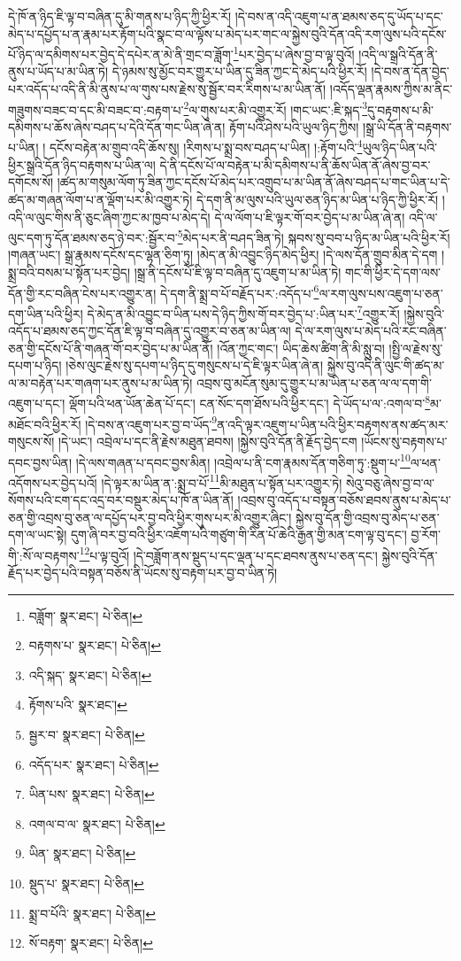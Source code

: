 དེ་ཁོ་ན་ཉིད་ཇི་ལྟ་བ་བཞིན་དུ་མི་གནས་པ་ཉིད་ཀྱི་ཕྱིར་རོ། །དེ་བས་ན་འདི་འཇུག་པ་ན་ཐམས་ཅད་དུ་ཡོད་པ་དང་མེད་པ་དཔྱོད་པ་ན་རྣམ་པར་རྟོག་པའི་སྣང་བ་ལ་ལྟོས་པ་མེད་པར་གང་ལ་སྐྱེས་བུའི་དོན་འདི་རག་ལུས་པའི་དངོས་པོ་ཉིད་ལ་དམིགས་པར་བྱེད་དེ་དཔེར་ན་མེ་ནི་གྲང་བ་ཟློག་\footnote{བཟློག་  སྣར་ཐང་།  པེ་ཅིན། }པར་བྱེད་པ་ཞེས་བྱ་བ་ལྟ་བུའོ། །འདི་ལ་སྒྲའི་དོན་ནི་ནུས་པ་ཡོད་པ་མ་ཡིན་ཏེ། དེ་ཉམས་སུ་མྱོང་བར་གྱུར་པ་ཡིན་དུ་ཟིན་ཀྱང་དེ་མེད་པའི་ཕྱིར་རོ། །དེ་བས་ན་དོན་བྱེད་པར་འདོད་པ་འདི་ནི་མི་ནུས་པ་ལ་གུས་པས་རྗེས་སུ་སྦྱོར་བར་རིགས་པ་མ་ཡིན་ནོ། །འདོད་ལྡན་རྣམས་ཀྱིས་མ་ནིང་གཟུགས་བཟང་བ་དང་མི་བཟང་བ་:བརྟག་པ་\footnote{བརྟགས་པ་  སྣར་ཐང་།  པེ་ཅིན། }ལ་གུས་པར་མི་འགྱུར་རོ། །གང་ཡང་:ཇི་སྐད་\footnote{འདི་སྐད་  སྣར་ཐང་།  པེ་ཅིན། }དུ་བརྟགས་པ་མི་དམིགས་པ་ཆོས་ཞེས་བཤད་པ་དེའི་དོན་གང་ཡིན་ཞེ་ན། རྟོག་པའི་ཤེས་པའི་ཡུལ་ཉིད་ཀྱིས། །སྒྲ་ཡི་དོན་ནི་བརྟགས་པ་ཡིན། །
དངོས་བརྟེན་མ་གྲུབ་འདི་ཆོས་སུ། །རིགས་པ་སྨྲ་བས་བཤད་པ་ཡིན། །:རྟོག་པའི་\footnote{རྟོགས་པའི་  སྣར་ཐང་། }ཡུལ་ཉིད་ཡིན་པའི་ཕྱིར་སྒྲའི་དོན་ཉིད་བརྟགས་པ་ཡིན་ལ། དེ་ནི་དངོས་པོ་ལ་བརྟེན་པ་མི་དམིགས་པ་ནི་ཆོས་ཡིན་ནོ་ཞེས་བྱ་བར་དགོངས་སོ། །ཚད་མ་གསུམ་ལོག་ཏུ་ཟིན་ཀྱང་དངོས་པོ་མེད་པར་འགྲུབ་པ་མ་ཡིན་ནོ་ཞེས་བཤད་པ་གང་ཡིན་པ་དེ་ཚད་མ་གཞན་ལོག་པ་ན་ལྡོག་པར་མི་འགྱུར་ཏེ། དེ་དག་ནི་མ་ལུས་པའི་ཡུལ་ཅན་ཉིད་མ་ཡིན་པ་ཉིད་ཀྱི་ཕྱིར་རོ། །འདི་ལ་ལུང་གིས་ནི་ཅུང་ཞིག་ཀྱང་མ་ཁྱབ་པ་མེད་དེ། དེ་ལ་ལོག་པ་ཇི་ལྟར་གོ་བར་བྱེད་པ་མ་ཡིན་ཞེ་ན། འདི་ལ་ལུང་དག་ཏུ་དོན་ཐམས་ཅད་ཉེ་བར་:སྦྱོར་བ་\footnote{སྦྱར་བ་  སྣར་ཐང་།  པེ་ཅིན། }མེད་པར་ནི་བཤད་ཟིན་ཏེ། སྐབས་སུ་བབ་པ་ཉིད་མ་ཡིན་པའི་ཕྱིར་རོ། །གཞན་ཡང་། སྒྲ་རྣམས་དངོས་དང་ལྷན་ཅིག་ཏུ། །མེད་ན་མི་འབྱུང་ཉིད་མེད་ཕྱིར། །དེ་ལས་དོན་གྲུབ་མིན་དེ་དག །སྨྲ་བའི་བསམ་པ་སྟོན་པར་བྱེད། །སྒྲ་ནི་དངོས་པོ་ཇི་ལྟ་བ་བཞིན་དུ་འཇུག་པ་མ་ཡིན་ཏེ། གང་གི་ཕྱིར་དེ་དག་ལས་དོན་གྱི་རང་བཞིན་ངེས་པར་འགྱུར་ན། དེ་དག་ནི་སྨྲ་བ་པོ་བརྗོད་པར་:འདོད་པ་\footnote{འདོད་པར་  སྣར་ཐང་།  པེ་ཅིན། }ལ་རག་ལུས་པས་འཇུག་པ་ཅན་དག་ཡིན་པའི་ཕྱིར། དེ་མེད་ན་མི་འབྱུང་བ་ཡིན་པས་དེ་ཉིད་ཀྱིས་གོ་བར་བྱེད་པ་:ཡིན་པར་\footnote{ཡིན་པས་  སྣར་ཐང་།  པེ་ཅིན། }འགྱུར་རོ། །སྐྱེས་བུའི་འདོད་པ་ཐམས་ཅད་ཀྱང་དོན་ཇི་ལྟ་བ་བཞིན་དུ་འགྱུར་བ་ཅན་མ་ཡིན་ལ། དེ་ལ་རག་ལུས་པ་མེད་པའི་རང་བཞིན་ཅན་གྱི་དངོས་པོ་ནི་གཞན་གོ་བར་བྱེད་པ་མ་ཡིན་ནོ། །འོན་ཀྱང་གང་། ཡིད་ཆེས་ཚིག་ནི་མི་སླུ་བ། །སྤྱི་ལ་རྗེས་སུ་དཔག་པ་ཉིད། །ཅེས་ལུང་རྗེས་སུ་དཔག་པ་ཉིད་དུ་གསུངས་པ་དེ་ཇི་ལྟར་ཡིན་ཞེ་ན། སྐྱེས་བུ་འདི་ནི་ལུང་གི་ཚད་མ་ལ་མ་བརྟེན་པར་གཞག་པར་ནུས་པ་མ་ཡིན་ཏེ། འབྲས་བུ་མངོན་སུམ་དུ་གྱུར་པ་མ་ཡིན་པ་ཅན་ལ་ལ་དག་གི་འཇུག་པ་དང་། ལྡོག་པའི་ཕན་ཡོན་ཆེན་པོ་དང་། ངན་སོང་དག་ཐོས་པའི་ཕྱིར་དང་། དེ་ཡོད་པ་ལ་:འགལ་བ་\footnote{འགལ་བ་ལ་  སྣར་ཐང་།  པེ་ཅིན། }མ་མཐོང་བའི་ཕྱིར་རོ། །དེ་བས་ན་འཇུག་པར་བྱ་བ་ཡོད་\footnote{ཡིན་  སྣར་ཐང་།  པེ་ཅིན། }ན་འདི་ལྟར་འཇུག་པ་ཡིན་པའི་ཕྱིར་བརྟགས་ནས་ཚད་མར་གསུངས་སོ། །དེ་ཡང་། འབྲེལ་པ་དང་ནི་རྗེས་མཐུན་ཐབས། །སྐྱེས་བུའི་དོན་ནི་རྗོད་བྱེད་ངག །ཡོངས་སུ་བརྟགས་པ་དབང་བྱས་ཡིན། །དེ་ལས་གཞན་པ་དབང་བྱས་མིན། །འབྲེལ་པ་ནི་ངག་རྣམས་དོན་གཅིག་ཏུ་:སྡུག་པ་\footnote{སྡུད་པ་  སྣར་ཐང་།  པེ་ཅིན། }ལ་ཕན་འདོགས་པར་བྱེད་པའོ། །དེ་ལྟར་མ་ཡིན་ན་:སྨྲ་བ་པོ་\footnote{སྨྲ་བ་པོའི་  སྣར་ཐང་།  པེ་ཅིན། }མི་མཐུན་པ་སྟོན་པར་འགྱུར་ཏེ། སེའུ་བཅུ་ཞེས་བྱ་བ་ལ་སོགས་པའི་ངག་དང་འདྲ་བར་བསྡུར་མེད་པ་ཁོ་ན་ཡིན་ནོ། །འབྲས་བུ་འདོད་པ་བསྟན་བཅོས་ཐབས་ནུས་པ་མེད་པ་ཅན་གྱི་འབྲས་བུ་ཅན་ལ་དཔྱོད་པར་བྱ་བའི་ཕྱིར་གུས་པར་མི་འགྱུར་ཞིང་། སྐྱེས་བུ་དོན་གྱི་འབྲས་བུ་མེད་པ་ཅན་དག་ལ་ཡང་སྟེ། དུག་ཞི་བར་བྱ་བའི་ཕྱིར་འཇོག་པའི་གཙུག་གི་རིན་པོ་ཆེའི་རྒྱན་གྱི་མན་ངག་ལྟ་བུ་དང་། བྱ་རོག་གི་:སོ་ལ་བརྟགས་\footnote{སོ་བརྟག་  སྣར་ཐང་།  པེ་ཅིན། }པ་ལྟ་བུའོ། །དེ་བཟློག་ནས་སྡུད་པ་དང་ལྡན་པ་དང་ཐབས་ནུས་པ་ཅན་དང་། སྐྱེས་བུའི་དོན་རྗོད་པར་བྱེད་པའི་བསྟན་བཅོས་ནི་ཡོངས་སུ་བརྟག་པར་བྱ་བ་ཡིན་ཏེ། 